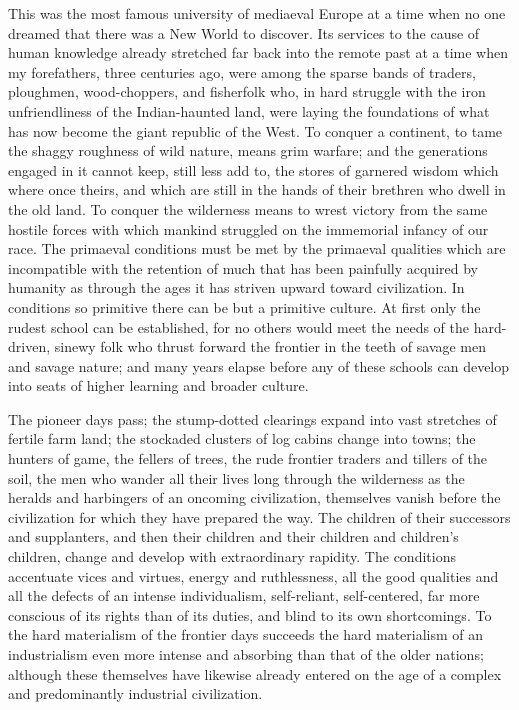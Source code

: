\documentclass[a4paper]{amsbook}
\begin{document}
This was the most famous university of mediaeval Europe at a time when no one dreamed that there was a New World to discover. Its services to the cause of human knowledge already stretched far back into the remote past at a time when my forefathers, three centuries ago, were among the sparse bands of traders, ploughmen, wood-choppers, and fisherfolk who, in hard struggle with the iron unfriendliness of the Indian-haunted land, were laying the foundations of what has now become the giant republic of the West. To conquer a continent, to tame the shaggy roughness of wild nature, means grim warfare; and the generations engaged in it cannot keep, still less add to, the stores of garnered wisdom which where once theirs, and which are still in the hands of their brethren who dwell in the old land. To conquer the wilderness means to wrest victory from the same hostile forces with which mankind struggled on the immemorial infancy of our race. The primaeval conditions must be met by the primaeval qualities which are incompatible with the retention of much that has been painfully acquired by humanity as through the ages it has striven upward toward civilization. In conditions so primitive there can be but a primitive culture. At first only the rudest school can be established, for no others would meet the needs of the hard-driven, sinewy folk who thrust forward the frontier in the teeth of savage men and savage nature; and many years elapse before any of these schools can develop into seats of higher learning and broader culture.

The pioneer days pass; the stump-dotted clearings expand into vast stretches of fertile farm land; the stockaded clusters of log cabins change into towns; the hunters of game, the fellers of trees, the rude frontier traders and tillers of the soil, the men who wander all their lives long through the wilderness as the heralds and harbingers of an oncoming civilization, themselves vanish before the civilization for which they have prepared the way. The children of their successors and supplanters, and then their children and their children and children's children, change and develop with extraordinary rapidity. The conditions accentuate vices and virtues, energy and ruthlessness, all the good qualities and all the defects of an intense individualism, self-reliant, self-centered, far more conscious of its rights than of its duties, and blind to its own shortcomings. To the hard materialism of the frontier days succeeds the hard materialism of an industrialism even more intense and absorbing than that of the older nations; although these themselves have likewise already entered on the age of a complex and predominantly industrial civilization.
\end{document}
